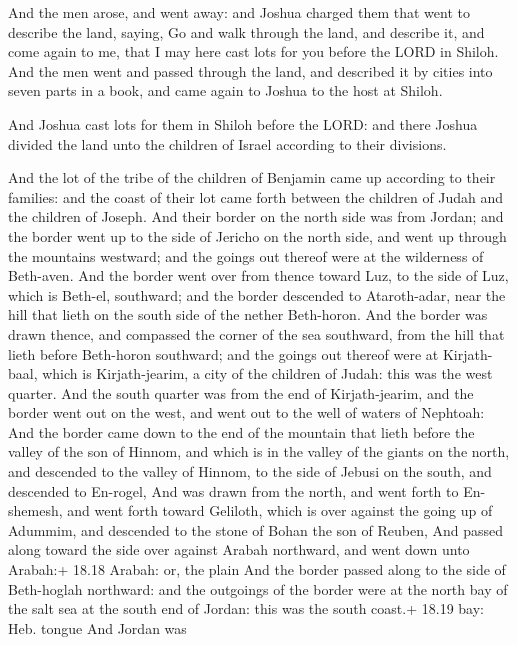  And the men arose, and went away: and Joshua charged them
that went to describe the land, saying, Go and walk through the land,
and describe it, and come again to me, that I may here cast lots for you
before the LORD in Shiloh.  And the men went and passed
through the land, and described it by cities into seven parts in a book,
and came again to Joshua to the host at Shiloh.

 And Joshua cast lots for them in Shiloh before the LORD:
and there Joshua divided the land unto the children of Israel according
to their divisions.

 And the lot of the tribe of the children of Benjamin
came up according to their families: and the coast of their lot came
forth between the children of Judah and the children of Joseph.
 And their border on the north side was from Jordan; and
the border went up to the side of Jericho on the north side, and went up
through the mountains westward; and the goings out thereof were at the
wilderness of Beth-aven.  And the border went over from
thence toward Luz, to the side of Luz, which is Beth-el, southward; and
the border descended to Ataroth-adar, near the hill that lieth on the
south side of the nether Beth-horon.  And the border was
drawn thence, and compassed the corner of the sea southward, from the
hill that lieth before Beth-horon southward; and the goings out thereof
were at Kirjath-baal, which is Kirjath-jearim, a city of the children of
Judah: this was the west quarter.  And the south quarter
was from the end of Kirjath-jearim, and the border went out on the west,
and went out to the well of waters of Nephtoah:  And the
border came down to the end of the mountain that lieth before the valley
of the son of Hinnom, and which is in the valley of the giants on the
north, and descended to the valley of Hinnom, to the side of Jebusi on
the south, and descended to En-rogel,  And was drawn from
the north, and went forth to En-shemesh, and went forth toward Geliloth,
which is over against the going up of Adummim, and descended to the
stone of Bohan the son of Reuben,  And passed along toward
the side over against Arabah northward, and went down unto Arabah:+
18.18 Arabah: or, the plain  And the border passed along to
the side of Beth-hoglah northward: and the outgoings of the border were
at the north bay of the salt sea at the south end of Jordan: this was
the south coast.+ 18.19 bay: Heb. tongue  And Jordan was
